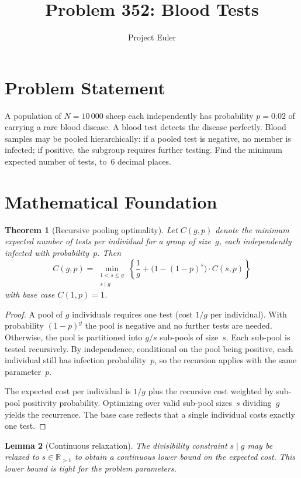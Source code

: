 \documentclass[a4paper,12pt]{article}
\title{Problem 352: Blood Tests}
\author{Project Euler}
\date{}
\newtheorem{theorem}{Theorem}
\newtheorem{lemma}[theorem]{Lemma}
\begin{document}
\maketitle

\section{Problem Statement}

A population of $N = 10\,000$ sheep each independently has probability $p = 0.02$ of carrying a rare blood disease. A blood test detects the disease perfectly. Blood samples may be pooled hierarchically: if a pooled test is negative, no member is infected; if positive, the subgroup requires further testing. Find the minimum expected number of tests, to~6 decimal places.

\section{Mathematical Foundation}

\begin{theorem}[Recursive pooling optimality]
Let $C(g, p)$ denote the minimum expected number of tests per individual for a group of size~$g$, each independently infected with probability~$p$. Then
\[
C(g, p) = \min_{\substack{1 < s \le g \\ s \mid g}} \left\{ \frac{1}{g} + \bigl(1 - (1-p)^s\bigr) \cdot C(s, p) \right\}
\]
with base case $C(1, p) = 1$.
\end{theorem}

\begin{proof}
A pool of $g$ individuals requires one test (cost $1/g$ per individual). With probability $(1-p)^g$ the pool is negative and no further tests are needed. Otherwise, the pool is partitioned into $g/s$ sub-pools of size~$s$. Each sub-pool is tested recursively. By independence, conditional on the pool being positive, each individual still has infection probability~$p$, so the recursion applies with the same parameter~$p$.

The expected cost per individual is $1/g$ plus the recursive cost weighted by sub-pool positivity probability. Optimizing over valid sub-pool sizes~$s$ dividing~$g$ yields the recurrence. The base case reflects that a single individual costs exactly one test.
\end{proof}

\begin{lemma}[Continuous relaxation]
The divisibility constraint $s \mid g$ may be relaxed to $s \in \mathbb{R}_{>1}$ to obtain a continuous lower bound on the expected cost. This lower bound is tight for the problem parameters.
\end{lemma}
\end{document}
